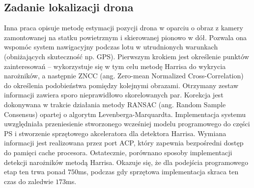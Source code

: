 \subsection{Zadanie lokalizacji drona}
Inna praca \cite{Chenini} opisuje metodę estymacji pozycji drona w oparciu o obraz z kamery zamontowanej na statku powietrznym i skierowanej pionowo w dół. 
Pozwala ona wspomóc system nawigacyjny podczas lotu w utrudnionych warunkach (obniżających skuteczność np. GPS). 
Pierwszym krokiem jest określenie punktów zainteresowań -- wykorzystuje się w tym celu metodę Harrisa do wykrycia narożników, a następnie ZNCC (ang. Zero-mean Normalized Cross-Correlation) do określenia podobieństwa pomiędzy kolejnymi obrazami. %
Otrzymany zestaw informacji zawiera sporo nieprawidłowo skorelowanych par. 
Korekcja jest dokonywana w trakcie działania metody RANSAC (ang. Random Sample Consensus) opartej o algorytm Levenberga-Marquardta. %
Implementacja systemu uwzględniała przeniesienie stworzonego wcześniej modelu programowego do części PS i stworzenie sprzętowego akceleratora dla detektora Harrisa. 
Wymiana informacji jest realizowana przez port ACP, który zapewnia bezpośredni dostęp do pamięci cache procesora. 
Ostatecznie, porównano sposoby implementacji detekcji narożników metodą Harrisa. 
Okazuje się, że dla podejścia programowego etap ten trwa ponad $750$ms, podczas gdy sprzętowa implementacja skraca ten czas do zaledwie $173$ms.

